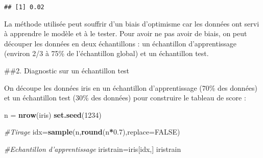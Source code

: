 \documentclass[
]{article}
\newenvironment{Shaded}{\begin{snugshade}}{\end{snugshade}}
\newcommand{\CommentTok}[1]{\textcolor[rgb]{0.56,0.35,0.01}{\textit{#1}}}
\newcommand{\DataTypeTok}[1]{\textcolor[rgb]{0.13,0.29,0.53}{#1}}
\newcommand{\DecValTok}[1]{\textcolor[rgb]{0.00,0.00,0.81}{#1}}
\newcommand{\FloatTok}[1]{\textcolor[rgb]{0.00,0.00,0.81}{#1}}
\newcommand{\KeywordTok}[1]{\textcolor[rgb]{0.13,0.29,0.53}{\textbf{#1}}}
\newcommand{\NormalTok}[1]{#1}
\newcommand{\OperatorTok}[1]{\textcolor[rgb]{0.81,0.36,0.00}{\textbf{#1}}}
\newcommand{\OtherTok}[1]{\textcolor[rgb]{0.56,0.35,0.01}{#1}}
\newcommand{\StringTok}[1]{\textcolor[rgb]{0.31,0.60,0.02}{#1}}
\begin{document}
\begin{verbatim}
## [1] 0.02
\end{verbatim}

La méthode utilisée peut souffrir d'un biais d'optimisme car les données
ont servi à apprendre le modèle et à le tester. Pour avoir ne pas avoir
de biais, on peut découper les données en deux échantillons : un
échantillon d'apprentissage (environ 2/3 à 75\% de l'échantillon global)
et un échantillon test.

\#\#2. Diagnostic sur un échantillon test

On découpe les données iris en un échantillon d'apprentissage (70\% des
données) et un échantillon test (30\% des données) pour construire le
tableau de score :

\begin{Shaded}
\begin{Highlighting}[]
\NormalTok{n =}\StringTok{ }\KeywordTok{nrow}\NormalTok{(iris)}
\KeywordTok{set.seed}\NormalTok{(}\DecValTok{1234}\NormalTok{)}

\CommentTok{#Tirage}
\NormalTok{idx=}\KeywordTok{sample}\NormalTok{(n,}\KeywordTok{round}\NormalTok{(n}\OperatorTok{*}\FloatTok{0.7}\NormalTok{),}\DataTypeTok{replace=}\OtherTok{FALSE}\NormalTok{)}

\CommentTok{#Echantillon d'apprentissage}
\NormalTok{iristrain=iris[idx,]}
\NormalTok{iristrain}
\end{Highlighting}
\end{Shaded}
\end{document}
